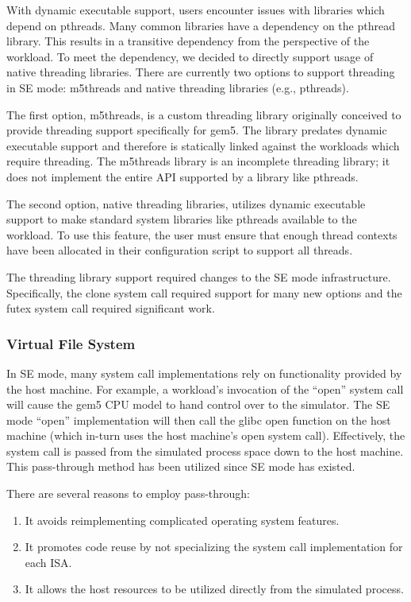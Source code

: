 With dynamic executable support, users encounter issues with libraries which depend on pthreads.
Many common libraries have a dependency on the pthread library.
This results in a transitive dependency from the perspective of the workload.
To meet the dependency, we decided to directly support usage of native threading libraries.
There are currently two options to support threading in SE mode: m5threads and native threading libraries (e.g., pthreads).

The first option, m5threads, is a custom threading library originally conceived to provide threading support specifically for gem5.
The library predates dynamic executable support and therefore is statically linked against the workloads which require threading.
The m5threads library is an incomplete threading library; it does not implement the entire API supported by a library like pthreads.

The second option, native threading libraries, utilizes dynamic executable support to make standard system libraries like pthreads available to the workload.
To use this feature, the user must ensure that enough thread contexts have been allocated in their configuration script to support all threads.

The threading library support required changes to the SE mode infrastructure.
Specifically, the clone system call required support for many new options and the futex system call required significant work.

\subsubsection{Virtual File System}
\label{sec:vfs}

In SE mode, many system call implementations rely on functionality provided by the host machine.
For example, a workload's invocation of the ``open'' system call will cause the gem5 CPU model to hand control over to the simulator.
The SE mode ``open'' implementation will then call the glibc open function on the host machine (which in-turn uses the host machine’s open system call).
Effectively, the system call is passed from the simulated process space down to the host machine.
This pass-through method has been utilized since SE mode has existed.

There are several reasons to employ pass-through:
\begin{enumerate}
    \item It avoids reimplementing complicated operating system features.
    \item It promotes code reuse by not specializing the system call implementation for each ISA.
    \item It allows the host resources to be utilized directly from the simulated process.
\end{enumerate}

